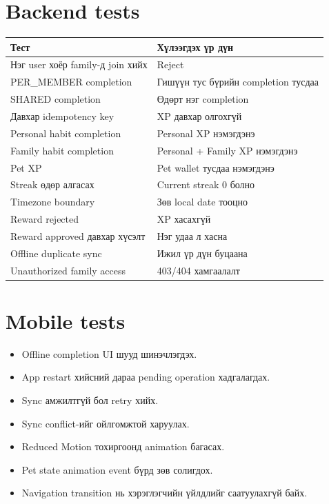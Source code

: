 \documentclass[12pt,a4paper,oneside]{report}
\begin{document}
\section{Backend tests}
\begin{longtable}{p{}p{}}
\toprule
\textbf{Тест} & \textbf{Хүлээгдэх үр дүн}\\
\midrule
Нэг user хоёр family-д join хийх & Reject\\
PER\_MEMBER completion & Гишүүн тус бүрийн completion тусдаа\\
SHARED completion & Өдөрт нэг completion\\
Давхар idempotency key & XP давхар олгохгүй\\
Personal habit completion & Personal XP нэмэгдэнэ\\
Family habit completion & Personal + Family XP нэмэгдэнэ\\
Pet XP & Pet wallet тусдаа нэмэгдэнэ\\
Streak өдөр алгасах & Current streak 0 болно\\
Timezone boundary & Зөв local date тооцно\\
Reward rejected & XP хасахгүй\\
Reward approved давхар хүсэлт & Нэг удаа л хасна\\
Offline duplicate sync & Ижил үр дүн буцаана\\
Unauthorized family access & 403/404 хамгаалалт\\
\bottomrule
\end{longtable}

\section{Mobile tests}
\begin{itemize}
  \item Offline completion UI шууд шинэчлэгдэх.
  \item App restart хийсний дараа pending operation хадгалагдах.
  \item Sync амжилтгүй бол retry хийх.
  \item Sync conflict-ийг ойлгомжтой харуулах.
  \item Reduced Motion тохиргоонд animation багасах.
  \item Pet state animation event бүрд зөв солигдох.
  \item Navigation transition нь хэрэглэгчийн үйлдлийг саатуулахгүй байх.
\end{itemize}
\end{document}
